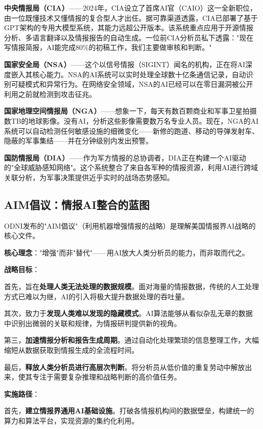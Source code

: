 \textbf{中央情报局（CIA）}——2024年，CIA设立了首席AI官（CAIO）这一全新职位，由一位既懂技术又懂情报的复合型人才出任。据可靠渠道透露，CIA已部署了基于GPT架构的专用大模型系统，其能力远超公开版本。该系统重点应用于开源情报分析、多语言翻译以及情报报告的自动生成。一位前CIA分析员私下透露："现在写情报简报，AI能完成80\%的初稿工作，我们主要做审核和判断。"

\textbf{国家安全局（NSA）}——这个以信号情报（SIGINT）闻名的机构，正在将AI深度嵌入其核心能力。NSA的AI系统可以实时处理全球数十亿条通信记录，自动识别可疑模式和异常行为。在网络安全领域，NSA的AI已经可以在零日漏洞被公开利用之前就检测到攻击征兆。

\textbf{国家地理空间情报局（NGA）}——想象一下，每天有数百颗商业和军事卫星拍摄数TB的地球影像。没有AI，分析这些影像需要数万名专业人员。现在，NGA的AI系统可以自动检测任何敏感设施的细微变化——新修的跑道、移动的导弹发射车、隐蔽的军事集结——并在分钟级别内发出预警。

\textbf{国防情报局（DIA）}——作为军方情报的总协调者，DIA正在构建一个AI驱动的"全球威胁感知网络"。这个系统整合了来自各军种的情报资源，利用AI进行跨域关联分析，为军事决策提供近乎实时的战场态势感知。

\subsection{AIM倡议：情报AI整合的蓝图}

ODNI发布的"AIM倡议"（利用机器增强情报的战略）是理解美国情报界AI战略的核心文件。

\textbf{核心理念}："增强"而非"替代"——用AI放大人类分析员的能力，而非取而代之。

\textbf{战略目标}：

首先，旨在\textbf{处理人类无法处理的数据规模}。面对海量的情报数据，传统的人工处理方式已难以为继，AI的引入将极大提升数据处理的吞吐量。

其次，致力于\textbf{发现人类难以发现的隐藏模式}。AI算法能够从看似杂乱无章的数据中识别出微弱的关联和规律，为情报研判提供新的视角。

第三，\textbf{加速情报分析和报告生成周期}。通过自动化处理繁琐的信息整理工作，大幅缩短从数据获取到情报生成的全流程时间。

最后，\textbf{释放人类分析员进行高层次判断}。将分析员从低价值的重复劳动中解放出来，使其专注于需要复杂推理和战略判断的高价值任务。

\textbf{实施路径}：

首先，\textbf{建立情报界通用AI基础设施}。打破各情报机构间的数据壁垒，构建统一的算力和算法平台，实现资源的集约化利用。

